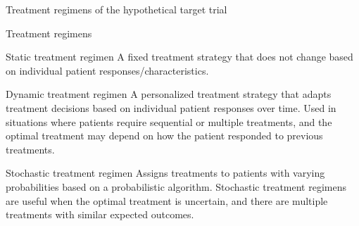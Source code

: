 \documentclass{beamer}\usepackage{listings}
\begin{document}
\begin{frame}[label={sec:orgb7f83fd}]{}
\huge \color{white}

Treatment regimens of the hypothetical target trial
\end{frame}


\begin{frame}[label={sec:org7eea4ec}]{Treatment regimens}
\begin{block}{Static treatment regimen}
A fixed treatment strategy that does not change based on individual
patient responses/characteristics.
\end{block}

\begin{block}{Dynamic treatment regimen}
A personalized treatment strategy that adapts treatment decisions
based on individual patient responses over time. Used in situations
where patients require sequential or multiple treatments, and the
optimal treatment may depend on how the patient responded to previous
treatments.
\end{block}

\begin{block}{Stochastic treatment regimen}
Assigns treatments to patients with varying probabilities based on a
probabilistic algorithm. Stochastic treatment regimens are useful when
the optimal treatment is uncertain, and there are multiple treatments
with similar expected outcomes.
\end{block}
\end{frame}
\end{document}
